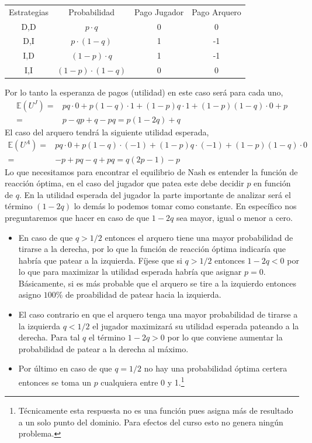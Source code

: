 \begin{center}
\begin{tabular}{cccc}
  Estrategias & Probabilidad & Pago Jugador & Pago Arquero \\
  D,D & $p\cdot q$ & 0 & 0 \\
  D,I & $p \cdot (1-q)$ & 1 & -1 \\
  I,D & $(1-p)\cdot q$ & 1 & -1 \\
  I,I & $(1-p)\cdot (1-q)$ & 0 & 0 
\end{tabular}
\end{center}

Por lo tanto la esperanza de pagos (utilidad) en este caso será para cada uno,
\begin{align*}
  \mathbb{E}(U^J) =& pq\cdot 0 + p(1-q)\cdot 1 + (1-p)q\cdot 1 + (1-p)(1-q)\cdot 0 + p \\
  = & p-qp + q-pq = p(1-2q) + q
\end{align*}
El caso del arquero tendrá la siguiente utilidad esperada,
\begin{align*}
  \mathbb{E}(U^A) =& pq \cdot 0 + p(1-q)\cdot(-1) + (1-p)q \cdot (-1) + (1-p)(1-q) \cdot 0 \\ = & -p+pq -q+pq = q(2p-1)-p
\end{align*}
Lo que necesitamos para encontrar el equilibrio de Nash es entender la función de reacción óptima, en el caso del jugador que patea este debe decidir $p$ en función de $q$. En la utilidad esperada del jugador la parte importante de analizar será el término $(1-2q)$ lo demás lo podemos tomar como constante. En específico nos preguntaremos que hacer en caso de que $1-2q$ sea mayor, igual o menor a cero.
\begin{itemize}
  \item En caso de que $q > 1/2$ entonces el arquero tiene una mayor probabilidad de tirarse a la derecha, por lo que la función de reacción óptima indicaría que habría que patear a la izquierda. Fíjese que si $q>1/2$ entonces $1-2q<0$ por lo que para maximizar la utilidad esperada habría que asignar $p = 0$. Básicamente, si es más probable que el arquero se tire a la izquierdo entonces asigno $100\%$ de proabilidad de patear hacia la izquierda. 
  \item El caso contrario en que el arquero tenga una mayor probabilidad de tirarse a la izquierda $q<1/2$ el jugador maximizará su utilidad esperada pateando a la derecha. Para tal $q$ el término $1-2q>0$ por lo que conviene aumentar la probabilidad de patear a la derecha al máximo. 
  \item Por último en caso de que $q = 1/2$ no hay una probabilidad óptima certera entonces se toma un $p$ cualquiera entre 0 y 1.\footnote{Técnicamente esta respuesta no es una función pues asigna más de resultado a un solo punto del dominio. Para efectos del curso esto no genera ningún problema.}
\end{itemize}
